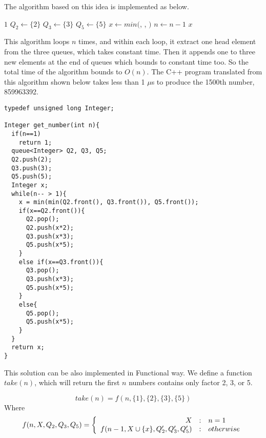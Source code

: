 \documentclass[UTF8]{article}
\begin{document}
The algorithm based on this idea is implemented as below.

\begin{algorithmic}[1]
    \State \Return $1$
  \Else
    \State $Q_2 \gets \{ 2 \}$
    \State $Q_3 \gets \{ 3 \}$
    \State $Q_5 \gets \{ 5 \}$
      \State $x \gets min($, , $)$
        \State {}
        \State {}
        \State {}
        \State {}
        \State {}
        \State {}
        \State {}
      \Else
        \State {}
        \State {}
      \EndIf
      \State $n \gets n - 1$
    \EndWhile
    \State \Return $x$
  \EndIf
\EndFunction
\end{algorithmic}

This algorithm loops $n$ times, and within each loop, it extract one head
element from the three queues, which takes constant time. Then it appends
one to three new elements at the end of queues which bounds to constant time
too. So the total time of the algorithm bounds to $O(n)$. The C++ program
translated from this algorithm shown below takes less than 1 $\mu$s to
produce the 1500th number, 859963392.

\lstset{language=C++}
\begin{lstlisting}
typedef unsigned long Integer;

Integer get_number(int n){
  if(n==1)
    return 1;
  queue<Integer> Q2, Q3, Q5;
  Q2.push(2);
  Q3.push(3);
  Q5.push(5);
  Integer x;
  while(n-- > 1){
    x = min(min(Q2.front(), Q3.front()), Q5.front());
    if(x==Q2.front()){
      Q2.pop();
      Q2.push(x*2);
      Q3.push(x*3);
      Q5.push(x*5);
    }
    else if(x==Q3.front()){
      Q3.pop();
      Q3.push(x*3);
      Q5.push(x*5);
    }
    else{
      Q5.pop();
      Q5.push(x*5);
    }
  }
  return x;
}
\end{lstlisting}

This solution can be also implemented in Functional way. We define
a function $take(n)$, which will return the first $n$ numbers contains
only factor 2, 3, or 5.

\[
  take(n) = f(n, \{1\}, \{2\}, \{3\}, \{5\})
\]
Where
\[
 f(n, X, Q_2, Q_3, Q_5) = \left \{
  \begin{array}{r@{\quad:\quad}l}
  X & n = 1 \\
  f(n-1, X \cup \{x\}, Q_2', Q_3', Q_5') & otherwise
  \end{array}
\right.
\]
\end{document}
